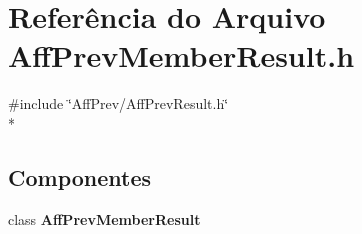 \section{Referência do Arquivo Aff\+Prev\+Member\+Result.\+h}
\label{_aff_prev_member_result_8h}
{\ttfamily \#include \char`\"{}Aff\+Prev/\+Aff\+Prev\+Result.\+h\char`\"{}}\\*
\subsection*{Componentes}
\begin{DoxyCompactItemize}
\item 
class {\bf Aff\+Prev\+Member\+Result}
\end{DoxyCompactItemize}
